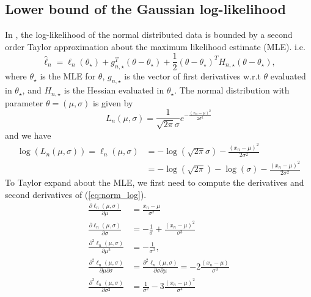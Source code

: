 \subsection{Lower bound of the Gaussian log-likelihood}
In \cite{Bardenet:1}, the log-likelihood of the normal distributed data is bounded by a second order Taylor approximation about the maximum likelihood estimate (MLE). i.e. 
\begin{equation}
  \hat{\ell}_n = \ell_n(\theta_{\star} ) + g_{n,\star}^T\left(\theta - \theta_{\star}\right) + \frac{1}{2}\left(\theta - \theta_{\star}\right)^T H_{n, \star}\left(\theta - \theta_{\star}\right),
\end{equation}
 where $\theta_{\star}$ is the MLE for $\theta$, $g_{n,\star}$ is the vector of first derivatives w.r.t $\theta$ evaluated in $\theta_{\star}$, and $H_{n, \star}$ is the Hessian evaluated in $\theta_{\star}$. The normal distribution with parameter $\theta = (\mu, \sigma)$  is given by 
\begin{equation}
    L_n(\mu, \sigma) = \frac{1}{\sqrt{2\pi}\sigma}e^{-\frac{\left(x_n-\mu\right)^2}{2\sigma^2}}
\end{equation}
and we have 
\begin{equation}\label{eq:norm_log}
\begin{split}
    \log\left(L_n(\mu, \sigma)\right) = \ell_n(\mu, \sigma) &= -\log\left(\sqrt{2\pi}\sigma\right) - \frac{\left(x_n - \mu\right)^2}{2\sigma^2} \\
    &= - \log\left(\sqrt{2\pi}\right) - \log\left(\sigma\right) - \frac{\left(x_n-\mu\right)^2}{2\sigma^2}
\end{split}
\end{equation}
To Taylor expand about the MLE, we first need to compute the derivatives and second derivatives of (\ref{eq:norm_log}). 
\begin{equation}
    \begin{split}
    \frac{\partial \ell_n\left(\mu, \sigma\right)}{\partial \mu} &= \frac{x_n - \mu}{\sigma^2} 
    \\ \frac{\partial \ell_n\left(\mu, \sigma\right)}{\partial \sigma} &= -\frac{1}{\sigma}  + \frac{\left(x_n - \mu \right)^2}{\sigma^3}\\
    \frac{\partial^2\ell_n(\mu, \sigma)}{\partial \mu ^2} &= -\frac{1}{\sigma^2}, \\ 
    \frac{\partial^2 \ell_n(\mu, \sigma)}{\partial\mu\partial \sigma} &=  \frac{\partial^2 \ell_n(\mu, \sigma)}{\partial \sigma \partial \mu} = -2\frac{(x_n - \mu)}{\sigma^3} \\  \frac{\partial^2 \ell_n(\mu, \sigma)}{\partial \sigma^2} &= \frac{1}{\sigma^2} - 3\frac{(x_n - \mu)^2}{\sigma^4}
\end{split}
\end{equation}
